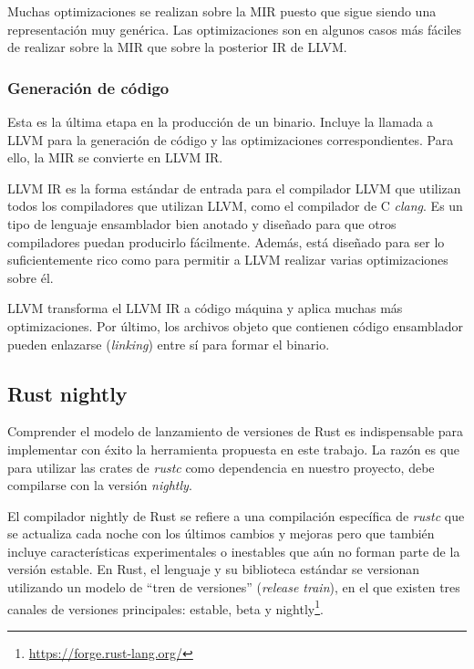 Muchas optimizaciones se realizan sobre la \acrshort{MIR}
puesto que sigue siendo una representación muy genérica.
Las optimizaciones son en algunos casos más fáciles de realizar sobre la \acrshort{MIR} que
sobre la posterior \acrshort{IR} de LLVM.

\subsubsection{Generación de código}

Esta es la última etapa en la producción de un binario. Incluye la llamada a LLVM para la
generación de código y las optimizaciones correspondientes.
Para ello, la \acrshort{MIR} se convierte en LLVM \acrshort{IR}.

LLVM \acrshort{IR} es la forma estándar de entrada para el compilador LLVM que utilizan todos los
compiladores que utilizan LLVM, como el compilador de C \emph{clang}. Es un tipo de lenguaje
ensamblador bien anotado y diseñado para que otros compiladores puedan producirlo
fácilmente. Además, está diseñado para ser lo suficientemente rico como para permitir a
LLVM realizar varias optimizaciones sobre él.

LLVM transforma el LLVM \acrshort{IR} a código máquina y aplica muchas más optimizaciones. Por
último, los archivos objeto que contienen código ensamblador pueden enlazarse (\emph{linking})
entre sí para formar el binario.

\subsection{Rust nightly}
\label{sec:rust-nightly}

Comprender el modelo de lanzamiento de versiones de Rust es
indispensable para implementar con éxito la herramienta propuesta en este trabajo.
La razón es que para utilizar las crates de \emph{rustc} como
dependencia en nuestro proyecto, debe compilarse con la versión \emph{nightly}.

El compilador nightly de Rust se refiere a una compilación específica de \emph{rustc} que se actualiza
cada noche con los últimos cambios y mejoras pero que también incluye características
experimentales o inestables que aún no forman parte de la versión estable. En Rust, el lenguaje
y su biblioteca estándar se versionan utilizando un modelo de ``tren de versiones'' (\textit{release train}),
en el que existen tres canales de versiones principales: estable, beta y nightly\footnote{\url{https://forge.rust-lang.org/}}.

